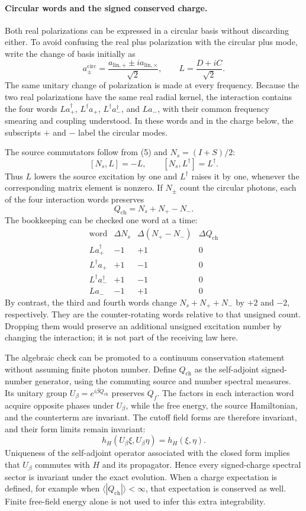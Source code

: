 \documentclass[10pt,twocolumn,letterpaper]{article}
\begin{document}
\paragraph{Circular words and the signed conserved charge.}
Both real polarizations can be expressed in a circular basis without
discarding either.  To avoid confusing the real plus polarization with
the circular plus mode, write the change of basis initially as
\[
a_\pm^{\mathrm{circ}}
=\frac{a_{\mathrm{lin},+}\pm i a_{\mathrm{lin},\times}}{\sqrt2},
\qquad L=\frac{D+iC}{\sqrt2}.
\]
The same unitary change of polarization is made at every frequency.
Because the two real polarizations have the same real radial kernel,
the interaction contains the four words
$La_+^\dagger$, $L^\dagger a_+$,
$L^\dagger a_-^\dagger$, and $La_-$, with their common frequency
smearing and coupling understood.  In these words and in the charge
below, the subscripts $+$ and $-$ label the circular modes.

The source commutators follow from (5) and $N_s=(I+S)/2$:
\[
[N_s,L]=-L,\qquad [N_s,L^\dagger]=L^\dagger.
\]
Thus $L$ lowers the source excitation by one and $L^\dagger$ raises it
by one, whenever the corresponding matrix element is nonzero.  If
$N_\pm$ count the circular photons, each of the four interaction words
preserves
\begin{equation}
Q_{\mathrm{ch}}=N_s+N_+-N_-.\tag{20}
\end{equation}
The bookkeeping can be checked one word at a time:
\[
\begin{array}{c|rr|r}
\text{word}&\Delta N_s&\Delta(N_+-N_-)&\Delta Q_{\mathrm{ch}}\\ \hline
La_+^\dagger&-1&+1&0\\
L^\dagger a_+&+1&-1&0\\
L^\dagger a_-^\dagger&+1&-1&0\\
La_-&-1&+1&0
\end{array}
\]
By contrast, the third and fourth words change
$N_s+N_++N_-$ by $+2$ and $-2$, respectively.  They are the
counter-rotating words relative to that unsigned count.  Dropping them
would preserve an additional unsigned excitation number by changing
the interaction; it is not part of the receiving law here.

The algebraic check can be promoted to a continuum conservation
statement without assuming finite photon number.  Define
$Q_{\mathrm{ch}}$ as the self-adjoint signed-number generator, using
the commuting source and number spectral measures.  Its unitary group
$U_\beta=e^{i\beta Q_{\mathrm{ch}}}$ preserves $Q_f$.  The factors in
each interaction word acquire opposite phases under $U_\beta$, while
the free energy, the source Hamiltonian, and the counterterm are
invariant.  The cutoff field forms are therefore invariant, and their
form limits remain invariant:
\[
h_H(U_\beta\xi,U_\beta\eta)=h_H(\xi,\eta).
\]
Uniqueness of the self-adjoint operator associated with the closed form
implies that $U_\beta$ commutes with $H$ and its propagator.  Hence every
signed-charge spectral sector is invariant under the exact evolution.
When a charge expectation is defined, for example when
$\langle|Q_{\mathrm{ch}}|\rangle<\infty$, that expectation is
conserved as well.  Finite free-field energy alone is not used to infer
this extra integrability.
\end{document}
